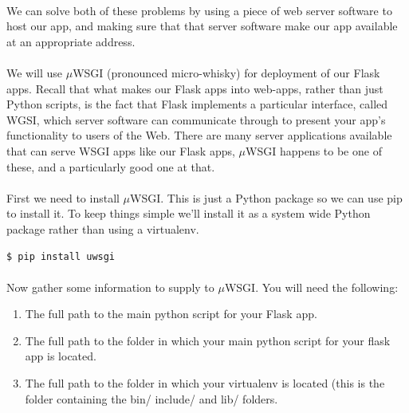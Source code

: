 \documentclass[12pt, a4paper, oneside]{book}
\begin{document}
\paragraph{} We can solve both of these problems by using a piece of web server software to host our app, and making sure that that server software make our app available at an appropriate address.

\paragraph{} We will use $\mu$WSGI (pronounced micro-whisky) for deployment of our Flask apps. Recall that what makes our Flask apps into web-apps, rather than just Python scripts, is the fact that Flask implements a particular interface, called WGSI, which server software can communicate through to present your app's functionality to users of the Web. There are many server applications available that can serve WSGI apps like our Flask apps, $\mu$WSGI happens to be one of these, and a particularly good one at that.

\paragraph{} First we need to install $\mu$WSGI. This is just a Python package so we can use pip to install it. To keep things simple we'll install it as a system wide Python package rather than using a virtualenv.

\begin{lstlisting}[style=DOS]
    $ pip install uwsgi
\end{lstlisting}


\paragraph{} Now gather some information to supply to $\mu$WSGI. You will need the following:

\begin{enumerate}
\item The full path to the main python script for your Flask app.
\item The full path to the folder in which your main python script for your flask app is located.
\item The full path to the folder in which your virtualenv is located (this is the folder containing the bin/ include/ and lib/ folders.
\end{enumerate}
\end{document}

